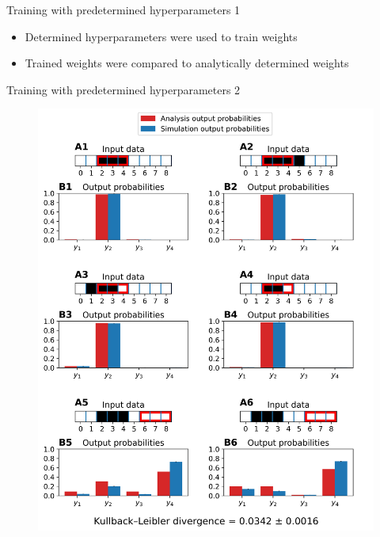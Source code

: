 \documentclass[aspectratio=169]{beamer}
\begin{document}
\begin{frame}{Training with predetermined hyperparameters 1}
  \begin{itemize}
    \item Determined hyperparameters were used to train weights
    \item Trained weights were compared to analytically determined weights
  \end{itemize}
\end{frame}

\begin{frame}{Training with predetermined hyperparameters 2}
 \vspace{-1.0cm}
		\begin{figure}
        \includegraphics[width=0.35\linewidth]{../Latex/figures/1D/training/trainingEvaluation_98_440_4_c3.png}
      \end{figure} 
\end{frame}
\end{document}
